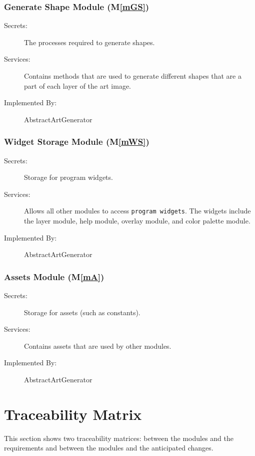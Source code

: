 \documentclass[12pt, titlepage]{article}
\newcommand{\mref}[1]{M\ref{#1}}
\begin{document}
\subsubsection{Generate Shape Module (\mref{mGS})}

\begin{description}
\item[Secrets:] The processes required to generate shapes.
\item[Services:] Contains methods that are used to generate different shapes that are a part of each layer of the art image.
\item[Implemented By:] AbstractArtGenerator
\end{description}

\subsubsection{Widget Storage Module (\mref{mWS})}

\begin{description}
\item[Secrets:] Storage for program widgets.
\item[Services:] Allows all other modules to access \texttt{program widgets}. The widgets include the layer module, help module, overlay module, and color palette module.
\item[Implemented By:] AbstractArtGenerator
\end{description}

\subsubsection{Assets Module (\mref{mA})}

\begin{description}
\item[Secrets:] Storage for assets (such as constants).
\item[Services:] Contains assets that are used by other modules.
\item[Implemented By:] AbstractArtGenerator
\end{description}

\section{Traceability Matrix} \label{SecTM}

This section shows two traceability matrices: between the modules and the
requirements and between the modules and the anticipated changes.
\end{document}
